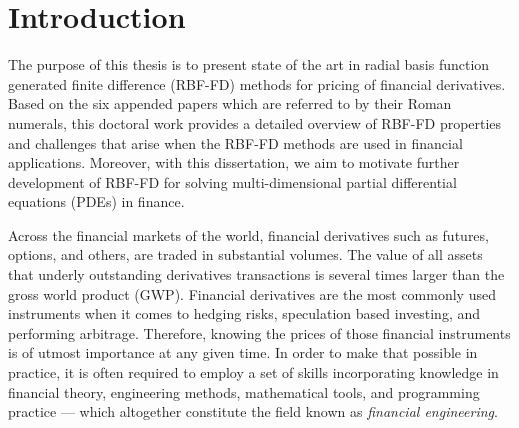 \documentclass{UUThesisTemplate}
\begin{document}
    \begingroup
        \tableofcontents
    \endgroup

\mainmatter
%    
%    
%    

%    
%
%





%
\chapter{Introduction}
\label{ch:introduction}

\par
The purpose of this thesis is to present state of the art in radial basis function generated finite difference (RBF-FD) methods for pricing of financial derivatives. Based on the six appended papers which are referred to by their Roman numerals, this doctoral work provides a detailed overview of RBF-FD properties and challenges that arise when the RBF-FD methods are used in financial applications. Moreover, with this dissertation, we aim to motivate further development of RBF-FD for solving multi-dimensional partial differential equations (PDEs) in finance.

\par
Across the financial markets of the world, financial derivatives such as futures, options, and others, are traded in substantial volumes. The value of all assets that underly outstanding derivatives transactions is several times larger than the gross world product (GWP). Financial derivatives are the most commonly used instruments when it comes to hedging risks, speculation based investing, and performing arbitrage. Therefore, knowing the prices of those financial instruments is of utmost importance at any given time. In order to make that possible in practice, it is often required to employ a set of skills incorporating knowledge in financial theory, engineering methods, mathematical tools, and programming practice --- which altogether constitute the field known as \emph{financial engineering}. 
\end{document}
